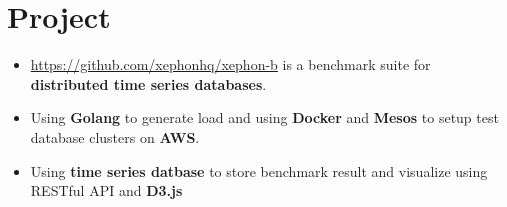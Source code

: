 \documentclass[10pt, letterpaper]{simple-cv}
\begin{document}
\section{Project}

\begin{itemize}
\item \url{https://github.com/xephonhq/xephon-b} is a benchmark suite for \textbf{distributed time series databases}.
\item Using \textbf{Golang} to generate load and using \textbf{Docker} and \textbf{Mesos} to setup test database clusters on \textbf{AWS}.
\item Using \textbf{time series datbase} to store benchmark result and visualize using RESTful API and \textbf{D3.js}
\end{itemize}

\end{document}
